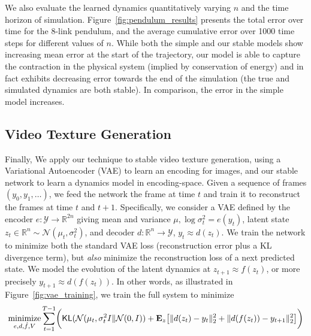 

We also evaluate the learned dynamics quantitatively varying $n$ and the time horizon of simulation. Figure~\ref{fig:pendulum_results} presents the total error over time for the 8-link pendulum, and the average cumulative error over 1000 time steps for different values of $n$.  While both the simple and our stable models show increasing mean error at the start of the trajectory, our model is able to capture the contraction in the physical system (implied by conservation of energy) and in fact exhibits decreasing error towards the end of the simulation (the true and simulated dynamics are both stable). In comparison, the error in the simple model increases.

\subsection{Video Texture Generation}

Finally, We apply our technique to stable video texture generation, using a Variational Autoencoder (VAE) \citep{kingma2013auto} to learn an encoding for images, and our stable network to learn a dynamics model in encoding-space.  Given a sequence of frames $(y_0, y_1, \ldots)$, we feed the network the frame at time $t$
and train it to reconstruct the frames at time $t$ and $t+1$.  Specifically, we consider a VAE defined by the encoder $e : \mathcal{Y} \rightarrow \mathbb{R}^{2n}$ giving mean and variance $\mu, \log \sigma^2_t = e(y_t)$, latent state $z_t \in \mathbb{R}^n \sim \mathcal{N}(\mu_t, \sigma_t^2)$, and decoder $d: \mathbb{R}^n \rightarrow \mathcal{Y}$, $y_t \approx d(z_t)$.  We train the network to minimize both the standard VAE loss (reconstruction error plus a KL divergence term), but \emph{also} minimize the reconstruction loss of a next predicted state. We model the evolution of the latent dynamics at $z_{t+1} \approx f(z_t)$, or more precisely $y_{t+1} \approx d(f(z_t))$.  In other words, as illustrated in Figure~\ref{fig:vae_training}, we train the full system to minimize
\begin{align}
	\operatorname*{minimize}_{e,d,\hat{f},V} \sum_{t=1}^{T-1} \biggl ( \mathsf{KL}(\mathcal{N}(\mu_t,\sigma_t^2 I\|\mathcal{N}(0,I)) + \mathbf{E}_z \bigl [ \|d(z_t) - y_t\|_2^2 + \| d(f(z_t)) - y_{t+1}\|_2^2 \bigr ] \biggr )
\end{align}





